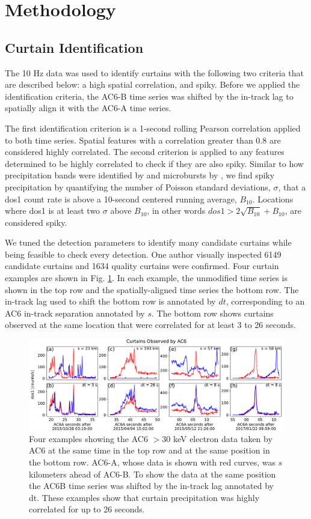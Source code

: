 \documentclass[draft]{agujournal2019}
\begin{document}
\section{Methodology} 
\subsection{Curtain Identification} \label{curtain_identification}
The 10 Hz data was used to identify curtains with the following two criteria that are described below: a high spatial correlation, and spiky. Before we applied the identification criteria, the AC6-B time series was shifted by the in-track lag to spatially align it with the AC6-A time series. 

The first identification criterion is a 1-second rolling Pearson correlation applied to both time series. Spatial features with a correlation greater than 0.8 are considered highly correlated. The second criterion is applied to any features determined to be highly correlated to check if they are also spiky. Similar to how precipitation bands were identified by  and microbursts by , we find spiky precipitation by quantifying the number of Poisson standard deviations, $\sigma$, that a dos1 count rate is above a 10-second centered running average, $B_{10}$. Locations where dos1 is at least two $\sigma$ above $B_{10}$, in other words $dos1 > 2\sqrt{B_{10}} + B_{10}$, are considered spiky. 

We tuned the detection parameters to identify many candidate curtains while being feasible to check every detection. One author visually inspected 6149 candidate curtains and 1634 quality curtains were confirmed. Four curtain examples are shown in Fig. \ref{fig1}. In each example, the unmodified time series is shown in the top row and the spatially-aligned time series the bottom row. The in-track lag used to shift the bottom row is annotated by $dt$, corresponding to an AC6 in-track separation annotated by $s$. The bottom row shows curtains observed at the same location that were correlated for at least 3 to 26 seconds.

\begin{figure}
\includegraphics[width=\textwidth]{fig1.pdf}
\caption{Four examples showing the AC6 $> 30$ keV electron data taken by AC6 at the same time in the top row and at the same position in the bottom row. AC6-A, whose data is shown with red curves, was $s$ kilometers ahead of AC6-B. To show the data at the same position the AC6B time series was shifted by the in-track lag annotated by dt. These examples show that curtain precipitation was highly correlated for up to 26 seconds.}
\label{fig1}
\end{figure}
\end{document}
